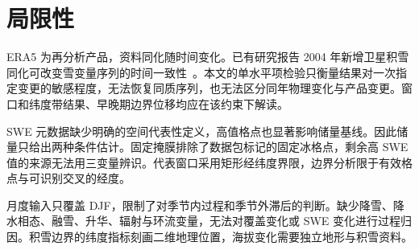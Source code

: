 \section{局限性}

ERA5 为再分析产品，资料同化随时间变化。已有研究报告 2004 年新增卫星积雪同化可改变雪变量序列的时间一致性~\cite{mortimer2020,urraca2023}。本文的单水平项检验只衡量结果对一次指定变更的敏感程度，无法恢复同质序列，也无法区分同年物理变化与产品变更。窗口和纬度带结果、早晚期边界位移均应在该约束下解读。

SWE 元数据缺少明确的空间代表性定义，高值格点也显著影响储量基线。因此储量只给出两种条件估计。固定掩膜排除了数据包标记的固定冰格点，剩余高 SWE 值的来源无法用三变量辨识。代表窗口采用矩形经纬度界限，边界分析限于有效格点与可识别交叉的经度。

月度输入只覆盖 DJF，限制了对季节内过程和季节外滞后的判断。缺少降雪、降水相态、融雪、升华、辐射与环流变量，无法对覆盖变化或 SWE 变化进行过程归因。积雪边界的纬度指标刻画二维地理位置，海拔变化需要独立地形与积雪资料。
